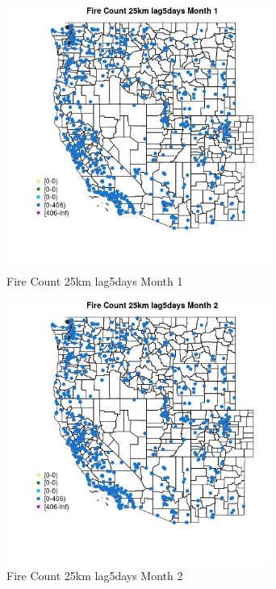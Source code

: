\begin{figure} 
\centering  
\includegraphics[width=0.77\textwidth]{Code_Outputs/Report_ML_input_PM25_Step4_part_f_de_duplicated_aves_prioritize_24hr_obswNAs_MapObsMo1Fire_Count_25km_lag5days.jpg} 
\caption{\label{fig:Report_ML_input_PM25_Step4_part_f_de_duplicated_aves_prioritize_24hr_obswNAsMapObsMo1Fire_Count_25km_lag5days}Fire Count 25km lag5days Month 1} 
\end{figure} 
 

\begin{figure} 
\centering  
\includegraphics[width=0.77\textwidth]{Code_Outputs/Report_ML_input_PM25_Step4_part_f_de_duplicated_aves_prioritize_24hr_obswNAs_MapObsMo2Fire_Count_25km_lag5days.jpg} 
\caption{\label{fig:Report_ML_input_PM25_Step4_part_f_de_duplicated_aves_prioritize_24hr_obswNAsMapObsMo2Fire_Count_25km_lag5days}Fire Count 25km lag5days Month 2} 
\end{figure} 
 

